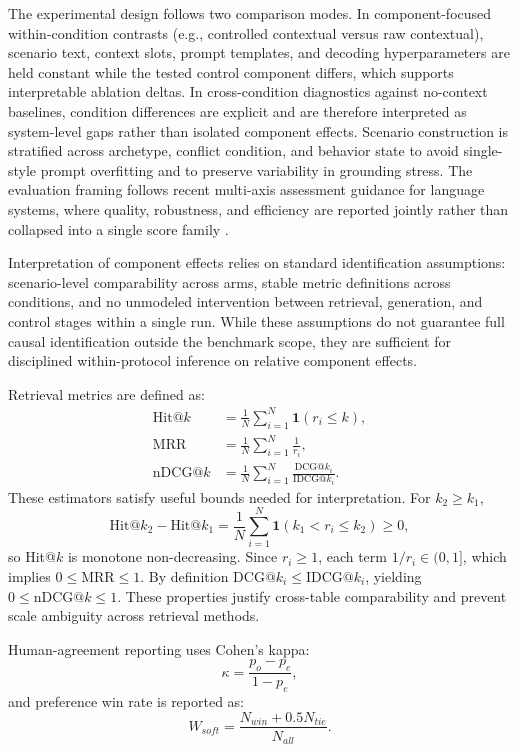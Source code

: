 ﻿\documentclass[a4paper,12pt]{article}
\newcommand{\ind}{\mathbf{1}}
\begin{document}
The experimental design follows two comparison modes. In component-focused within-condition contrasts (e.g., controlled contextual versus raw contextual), scenario text, context slots, prompt templates, and decoding hyperparameters are held constant while the tested control component differs, which supports interpretable ablation deltas. In cross-condition diagnostics against no-context baselines, condition differences are explicit and are therefore interpreted as system-level gaps rather than isolated component effects. Scenario construction is stratified across archetype, conflict condition, and behavior state to avoid single-style prompt overfitting and to preserve variability in grounding stress. The evaluation framing follows recent multi-axis assessment guidance for language systems, where quality, robustness, and efficiency are reported jointly rather than collapsed into a single score family \cite{Liang2023HELM}.

Interpretation of component effects relies on standard identification assumptions: scenario-level comparability across arms, stable metric definitions across conditions, and no unmodeled intervention between retrieval, generation, and control stages within a single run. While these assumptions do not guarantee full causal identification outside the benchmark scope, they are sufficient for disciplined within-protocol inference on relative component effects.

Retrieval metrics are defined as:
\begin{align}
\mathrm{Hit@}k &= \frac{1}{N}\sum_{i=1}^{N}\ind\!\left(r_i\le k\right),\\
\mathrm{MRR} &= \frac{1}{N}\sum_{i=1}^{N}\frac{1}{r_i},\\
\mathrm{nDCG@}k &= \frac{1}{N}\sum_{i=1}^{N}\frac{\mathrm{DCG@}k_i}{\mathrm{IDCG@}k_i}.
\end{align}
These estimators satisfy useful bounds needed for interpretation. For \(k_2\ge k_1\),
\begin{equation}
\mathrm{Hit@}k_2-\mathrm{Hit@}k_1
=\frac{1}{N}\sum_{i=1}^{N}\ind(k_1<r_i\le k_2)\ge0,
\end{equation}
so Hit@\(k\) is monotone non-decreasing. Since \(r_i\ge1\), each term \(1/r_i\in(0,1]\), which implies \(0\le\mathrm{MRR}\le1\). By definition \(\mathrm{DCG@}k_i\le\mathrm{IDCG@}k_i\), yielding \(0\le\mathrm{nDCG@}k\le1\). These properties justify cross-table comparability and prevent scale ambiguity across retrieval methods.

Human-agreement reporting uses Cohen's kappa:
\begin{equation}
\kappa=\frac{p_o-p_e}{1-p_e},
\end{equation}
and preference win rate is reported as:
\begin{equation}
W_{soft}=\frac{N_{win}+0.5N_{tie}}{N_{all}}.
\end{equation}
\end{document}
